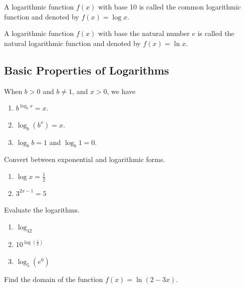 A logarithmic function \(f(x)\) with base 10 is called the common
logarithmic function and denoted by \(f(x)=\log x\).

A logarithmic function \(f(x)\) with base the natural number \(e\) is
called the natural logarithmic function and denoted by \(f(x)=\ln x\).

\hypertarget{basic-properties-of-logarithms}{%
\subsection{Basic Properties of
Logarithms}\label{basic-properties-of-logarithms}}

When \(b>0\) and \(b\neq 1\), and \(x>0\), we have

\begin{enumerate}[sepno]
\item
  \(b^{\log_bx}=x\).
\item
  \(\log_b(b^x)=x\).
\item
  \(\log_bb=1\) and \(\log_b1=0\).
\end{enumerate}

\begin{example}

Convert between exponential and logarithmic forms.

\begin{enumerate}
\item
  \(\log x=\frac{1}{2}\)
\item
  \(3^{2x-1}=5\)
\end{enumerate}

\end{example}

\begin{example}

Evaluate the logarithms.

\begin{enumerate}
\item
  \(\log_42\)
\item
  \(10^{\log(\frac{1}{2})}\)
\item
  \(\log_5(e^0)\)
\end{enumerate}

\end{example}

\begin{example}

Find the domain of the function \(f(x)=\ln(2-3x)\).

\end{example}
\vspace*{6\baselineskip}

